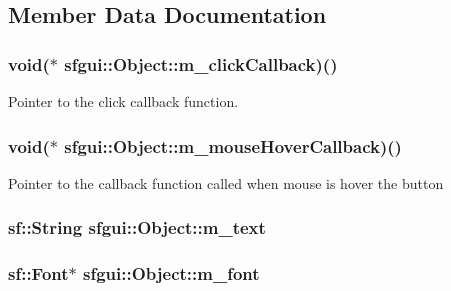\subsection{Member Data Documentation}
\hypertarget{classsfgui_1_1Object_5917de9750aa3c8d282899ee83f835b4}{
\subsubsection[m\_\-clickCallback]{\setlength{\rightskip}{0pt plus 5cm}void($\ast$ {\bf sfgui::Object::m\_\-clickCallback})()}}
\label{classsfgui_1_1Object_5917de9750aa3c8d282899ee83f835b4}


Pointer to the click callback function. 

\hypertarget{classsfgui_1_1Object_ddff61a2d47a7b25e05aa5b6311417ea}{
\subsubsection[m\_\-mouseHoverCallback]{\setlength{\rightskip}{0pt plus 5cm}void($\ast$ {\bf sfgui::Object::m\_\-mouseHoverCallback})()}}
\label{classsfgui_1_1Object_ddff61a2d47a7b25e05aa5b6311417ea}


Pointer to the callback function called when mouse is hover the button \hypertarget{classsfgui_1_1Object_b63c033215c2f6f1d64645e3c6f0153b}{
\subsubsection[m\_\-text]{\setlength{\rightskip}{0pt plus 5cm}sf::String {\bf sfgui::Object::m\_\-text}}}
\label{classsfgui_1_1Object_b63c033215c2f6f1d64645e3c6f0153b}


\hypertarget{classsfgui_1_1Object_20ec4624e3d9b8e3cebeb71ec97fd104}{
\subsubsection[m\_\-font]{\setlength{\rightskip}{0pt plus 5cm}sf::Font$\ast$ {\bf sfgui::Object::m\_\-font}}}
\label{classsfgui_1_1Object_20ec4624e3d9b8e3cebeb71ec97fd104}


